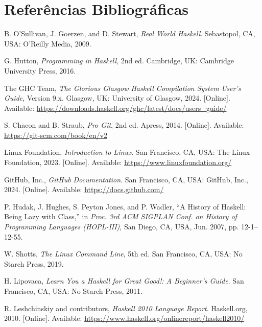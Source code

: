 \documentclass[12pt, a4paper, oneside]{report}
\begin{document}
\chapter*{Referências Bibliográficas}

\begin{enumerate}[label={[{{\arabic*}}]}]

\item B. O'Sullivan, J. Goerzen, and D. Stewart, \textit{Real World Haskell}. Sebastopol, CA, USA: O'Reilly Media, 2009.

\item G. Hutton, \textit{Programming in Haskell}, 2nd ed. Cambridge, UK: Cambridge University Press, 2016.

\item The GHC Team, \textit{The Glorious Glasgow Haskell Compilation System User's Guide}, Version 9.x. Glasgow, UK: University of Glasgow, 2024. [Online]. Available: \url{https://downloads.haskell.org/ghc/latest/docs/users_guide/}

\item S. Chacon and B. Straub, \textit{Pro Git}, 2nd ed. Apress, 2014. [Online]. Available: \url{https://git-scm.com/book/en/v2}

\item Linux Foundation, \textit{Introduction to Linux}. San Francisco, CA, USA: The Linux Foundation, 2023. [Online]. Available: \url{https://www.linuxfoundation.org/}

\item GitHub, Inc., \textit{GitHub Documentation}. San Francisco, CA, USA: GitHub, Inc., 2024. [Online]. Available: \url{https://docs.github.com/}

\item P. Hudak, J. Hughes, S. Peyton Jones, and P. Wadler, ``A History of Haskell: Being Lazy with Class,'' in \textit{Proc. 3rd ACM SIGPLAN Conf. on History of Programming Languages (HOPL-III)}, San Diego, CA, USA, Jun. 2007, pp. 12-1--12-55.

\item W. Shotts, \textit{The Linux Command Line}, 5th ed. San Francisco, CA, USA: No Starch Press, 2019.

\item H. Lipovaca, \textit{Learn You a Haskell for Great Good!: A Beginner's Guide}. San Francisco, CA, USA: No Starch Press, 2011.

\item R. Leshchinskiy and contributors, \textit{Haskell 2010 Language Report}. Haskell.org, 2010. [Online]. Available: \url{https://www.haskell.org/onlinereport/haskell2010/}

\end{enumerate}
\end{document}
